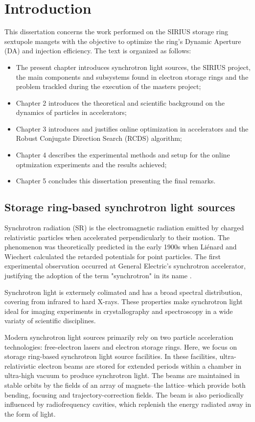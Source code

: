 \chapter{Introduction}
This dissertation concerns the work performed on the SIRIUS storage ring sextupole mangets with the objective to optimize the ring's Dynamic Aperture (DA) and injection efficiency. The text is organized as follows:
\begin{itemize}
    \item The present chapter introduces synchrotron light sources, the SIRIUS project, the main components and subsystems found in electron storage rings and the problem trackled during the execution of the masters project;
    \item Chapter 2 introduces the theoretical and scientific background on the dynamics of particles in accelerators;
    \item Chapter 3 introduces and justifies online optimization in accelerators and the Robust Conjugate Direction Search (RCDS) algorithm;
    \item Chapter 4 describes the experimental methods and setup for the online optmization experiments and the results achieved;
    \item Chapter 5 concludes this dissertation presenting the final remarks.
\end{itemize}

\section{Storage ring-based synchrotron light sources}
Synchrotron radiation (SR) is the electromagnetic radiation emitted by charged relativistic particles when accelerated perpendicularly to their motion. The phenomenon was theoretically predicted in the early 1900s when Liénard and Wiechert calculated the retarded potentials for point particles. The first experimental observation occurred at General Electric's synchrotron accelerator, justifying the adoption of the term "synchrotron" in its name \cite{wiedemann_particle_2015}.

Synchrotron light is extermely colimated and has a broad spectral distribution, covering from infrared to hard X-rays. These properties make synchrotron light ideal for imaging experiments in crystallography and spectroscopy in a wide variaty of scientific disciplines.

Modern synchrotron light sources primarily rely on two particle acceleration technologies: free-electron lasers and electron storage rings. Here, we focus on storage ring-based synchrotron light source facilities. In these facilities, ultra-relativistic electron beams are stored for extended periods within a chamber in ultra-high vacuum to produce synchrotron light. The beams are maintained in stable orbits by the fields of an array of magnets--the lattice--which provide both bending, focusing and trajectory-correction fields. The beam is also periodically influenced by radiofrequency cavities, which replenish the energy radiated away in the form of light.

